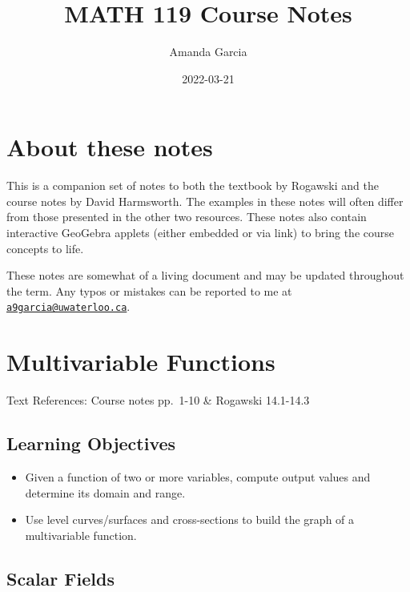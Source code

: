 \documentclass[
]{book}
\title{MATH 119 Course Notes}
\author{Amanda Garcia}
\date{2022-03-21}
\providecommand{\tightlist}{%
  \setlength{\itemsep}{0pt}\setlength{\parskip}{0pt}}
\theoremstyle{definition}
\theoremstyle{definition}
\theoremstyle{definition}
\theoremstyle{definition}
\theoremstyle{remark}
\begin{document}
\maketitle

{
\setcounter{tocdepth}{1}
\tableofcontents
}
\hypertarget{about-these-notes}{%
\chapter*{About these notes}\label{about-these-notes}}

This is a companion set of notes to both the textbook by Rogawski and the course notes by David Harmsworth. The examples in these notes will often differ from those presented in the other two resources. These notes also contain interactive GeoGebra applets (either embedded or via link) to bring the course concepts to life.

These notes are somewhat of a living document and may be updated throughout the term. Any typos or mistakes can be reported to me at \href{mailto:a9garcia@uwaterloo.ca}{\nolinkurl{a9garcia@uwaterloo.ca}}.

\hypertarget{lec-1}{%
\chapter{Multivariable Functions}\label{lec-1}}

Text References: Course notes pp.~1-10 \& Rogawski 14.1-14.3

\hypertarget{learning-objectives}{%
\section{Learning Objectives}\label{learning-objectives}}

\begin{itemize}
\tightlist
\item
  Given a function of two or more variables, compute output values and determine its domain and range.
\item
  Use level curves/surfaces and cross-sections to build the graph of a multivariable function.
\end{itemize}

\hypertarget{scalar-fields}{%
\section{Scalar Fields}\label{scalar-fields}}
\end{document}
